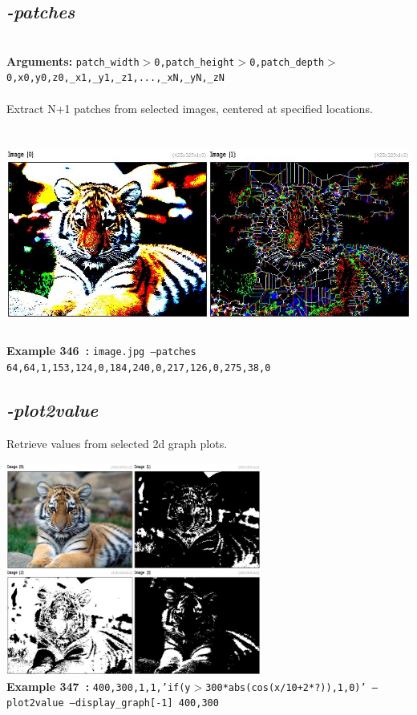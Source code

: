 \documentclass[a4paper,11pt,twoside]{book}
\begin{document}
\subsection{\emph{-patches} }\vspace*{-0.5em}
~\\\textbf{Arguments: } 
{\small \texttt{patch\_width$>$0,patch\_height$>$0,patch\_depth$>$0,x0,y0,z0,\_x1,\_y1,\_z1,...,\_xN,\_yN,\_zN}}\\~\\
Extract N+1 patches from selected images, centered at specified locations.
\begin{center}\includegraphics[keepaspectratio=true,height=7cm,width=\textwidth]{img/gmic_def346.jpg}\\
{\footnotesize \textbf{Example 346~:} \texttt{image.jpg --patches 64,64,1,153,124,0,184,240,0,217,126,0,275,38,0}}
\end{center}

\subsection{\emph{-plot2value} }\vspace*{-0.5em}
Retrieve values from selected 2d graph plots.
\begin{center}\includegraphics[keepaspectratio=true,height=7cm,width=\textwidth]{img/gmic_def347.jpg}\\
{\footnotesize \textbf{Example 347~:} \texttt{400,300,1,1,'if(y$>$300*abs(cos(x/10+2*?)),1,0)' --plot2value --display\_graph[-1] 400,300}}
\end{center}
\end{document}
